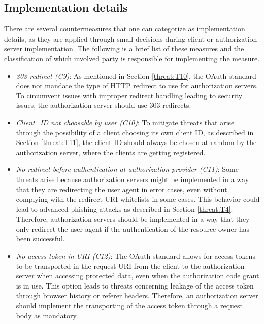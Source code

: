 \subsection{Implementation details}
\label{counter:C9_10_11_12_13_14}

There are several countermeasures that one can categorize as implementation details, as they are applied through small decisions during client or authorization server implementation. The following is a brief list of these measures and the classification of which involved party is responsible for implementing the measure.
\begin{itemize}

\item \emph{303 redirect (C9)}: As mentioned in Section \ref{threat:T10}, the OAuth standard does not mandate the type of HTTP redirect to use for authorization servers. To circumvent issues with improper redirect handling leading to security issues, the authorization server should use 303 redirects.

\item \emph{Client\_ID not choosable by user (C10)}: To mitigate threats that arise through the possibility of a client choosing its own client ID, as described in Section \ref{threat:T11}, the client ID should always be chosen at random by the authorization server, where the clients are getting registered.

\item \emph{No redirect before authentication at authorization provider (C11)}: Some threats arise because authorization servers might be implemented in a way that they are redirecting the user agent in error cases, even without complying with the redirect URI whitelists in some cases. This behavior could lead to advanced phishing attacks as described in Section \ref{threat:T4}. Therefore, authorization servers should be implemented in a way that they only redirect the user agent if the authentication of the resource owner has been successful.

\item \emph{No access token in URI (C12)}: The OAuth standard allows for access tokens to be transported in the request URI from the client to the authorization server when accessing protected data, even when the authorization code grant is in use. This option leads to threats concerning leakage of the access token through browser history or referer headers. Therefore, an authorization server should implement the transporting of the access token through a request body as mandatory.


\end{itemize}
